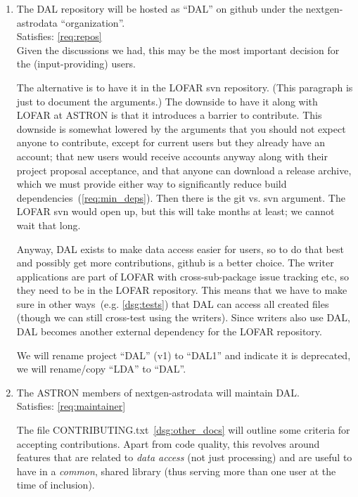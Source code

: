 \documentclass[a4paper,11pt]{article}
\begin{document}
\begin{enumerate}[resume, label=\it D.\arabic{*}]
\itemsep0em

\item \label{dsg:repos} The DAL repository will be hosted as ``DAL'' on github under the nextgen-astrodata ``organization''.\\
Satisfies: \ref{req:repos}\\
Given the discussions we had, this may be the most important decision for the (input-providing) users.

The alternative is to have it in the LOFAR svn repository.
(This paragraph is just to document the arguments.)
The downside to have it along with LOFAR at ASTRON is that it introduces a barrier to contribute.
This downside is somewhat lowered by the arguments that you should not expect anyone to contribute, except for current users but they already have an account; that new users would receive accounts anyway along with their project proposal acceptance, and that anyone can download a release archive, which we must provide either way to significantly reduce build dependencies~(\ref{req:min_deps}).
Then there is the git vs. svn argument.
The LOFAR svn would open up, but this will take months at least; we cannot wait that long.

Anyway, DAL exists to make data access easier for users, so to do that best and possibly get more contributions, github is a better choice.
The writer applications are part of LOFAR with cross-sub-package issue tracking etc, so they need to be in the LOFAR repository.
This means that we have to make sure in other ways~(e.g. \ref{dsg:tests}) that DAL can access all created files (though we can still cross-test using the writers).
Since writers also use DAL, DAL becomes another external dependency for the LOFAR repository.

We will rename project ``DAL'' (v1) to ``DAL1'' and indicate it is deprecated, we will rename/copy ``LDA'' to ``DAL''.

\item \label{dsg:maintainer} The ASTRON members of nextgen-astrodata will maintain DAL.\\
Satisfies: \ref{req:maintainer}

The file CONTRIBUTING.txt~\ref{dsg:other_docs} will outline some criteria for accepting contributions.
Apart from code quality, this revolves around features that are related to \emph{data access} (not just processing) and are useful to have in a \emph{common}, shared library (thus serving more than one user at the time of inclusion).


\end{enumerate}
\end{document}
